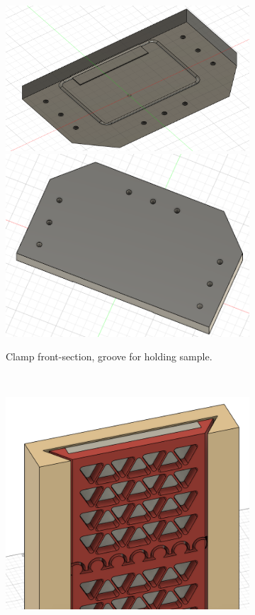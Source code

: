 \begin{figure}
    ~
    \begin{subfigure}[t]{0.3\textwidth}
        \includegraphics[width=\textwidth]{Main/Ch4/3D_models/clamp-top-bottom.png}
        \includegraphics[width=\textwidth]{Main/Ch4/3D_models/clamp-top-top.png}
        \caption{Clamp front-section, groove for holding sample.}
    \end{subfigure}
    ~
    \begin{subfigure}[t]{0.5\textwidth}
        \includegraphics[width=\textwidth]{Main/Ch4/3D_models/Anode-Holder-Full-Assembly.png}

\end{subfigure}
\end{figure}

